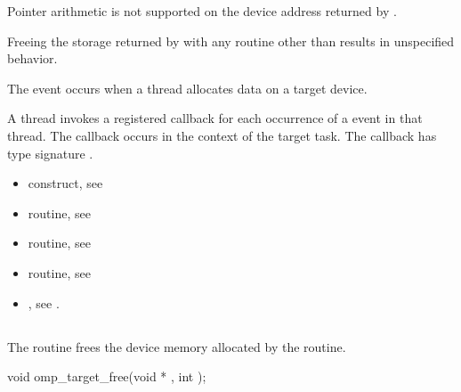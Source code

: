 Pointer arithmetic is not supported on the device address returned by
.

Freeing the storage returned by  with any routine
other than  results in unspecified behavior.

\events
The  event occurs when a thread allocates data on a target device.

\tools

A thread invokes a registered 
callback for each occurrence of a  event in that thread. 
The callback occurs in the context of the target task.  The callback has type signature
. 


\crossreferences
\begin{itemize}
\item {} construct, see 

\item {} routine, see 

\item {} routine, see 

\item {} routine, see 

\item {}, see 
.

\end{itemize}



\pagebreak

\subsection{}
\label{subsec:omp_target_free}
\summary
The  routine frees the device memory allocated by the  routine.

\format
\begin{boxedcode}
void omp\_target\_free(void * , int );
\end{boxedcode}

